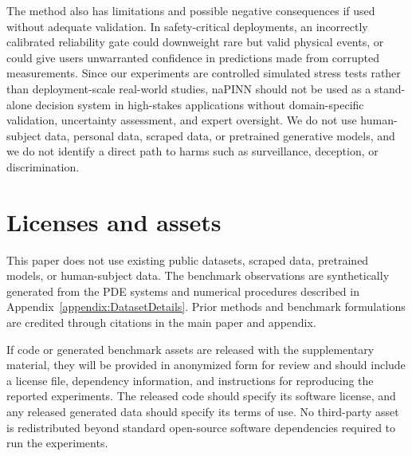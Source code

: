 \documentclass{article}
\theoremstyle{plain}
\theoremstyle{definition}
\theoremstyle{remark}
\begin{document}
The method also has limitations and possible negative consequences if used without adequate validation.
In safety-critical deployments, an incorrectly calibrated reliability gate could downweight rare but valid physical events, or could give users unwarranted confidence in predictions made from corrupted measurements.
Since our experiments are controlled simulated stress tests rather than deployment-scale real-world studies, naPINN should not be used as a stand-alone decision system in high-stakes applications without domain-specific validation, uncertainty assessment, and expert oversight.
We do not use human-subject data, personal data, scraped data, or pretrained generative models, and we do not identify a direct path to harms such as surveillance, deception, or discrimination.

\section{Licenses and assets}

This paper does not use existing public datasets, scraped data, pretrained models, or human-subject data.
The benchmark observations are synthetically generated from the PDE systems and numerical procedures described in Appendix~\ref{appendix:DatasetDetails}.
Prior methods and benchmark formulations are credited through citations in the main paper and appendix.

If code or generated benchmark assets are released with the supplementary material, they will be provided in anonymized form for review and should include a license file, dependency information, and instructions for reproducing the reported experiments.
The released code should specify its software license, and any released generated data should specify its terms of use.
No third-party asset is redistributed beyond standard open-source software dependencies required to run the experiments.


\newpage
%
\end{document}
